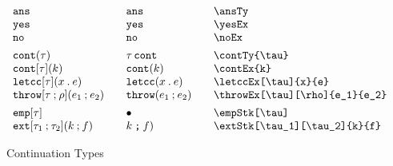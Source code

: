 \documentclass[11pt]{article}
\begin{document}
\begin{figure}

  \begin{small}
    \begin{displaymath}
      \begin{array}{l@{\qquad}l@{\qquad}l@{\qquad}l}
        \ansTy                         & \ansTy*             & \verb|\ansTy|                         \\
        \yesEx                         & \yesEx*             & \verb|\yesEx|                         \\
        \noEx                          & \noEx*              & \verb|\noEx|                          \\[1ex]
  
        \contTy{\tau}                  & \contTy*{\tau}      & \verb|\contTy{\tau}|                  \\
        \contEx{k}                     & \contEx*{k}         & \verb|\contEx{k} |                    \\
        \letccEx[\tau]{x}{e}           & \letccEx*{x}{e}     & \verb|\letccEx[\tau]{x}{e}|           \\
        \throwEx[\tau][\rho]{e_1}{e_2} & \throwEx*{e_1}{e_2} & \verb|\throwEx[\tau][\rho]{e_1}{e_2}| \\[1ex]
  
        \empStk[\tau]                  & \empStk*[\tau]      & \verb|\empStk[\tau]|                  \\
        \extStk[\tau_1][\tau_2]{k}{f}  & \extStk*{k}{f}      & \verb|\extStk[\tau_1][\tau_2]{k}{f}|
      \end{array}
    \end{displaymath}
  \end{small}

  \caption{Continuation Types}
  \label{fig:cont}
\end{figure}
\end{document}
